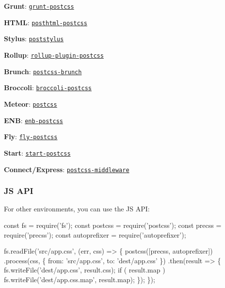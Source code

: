 \begin{DoxyItemize}
\item {\bfseries Grunt}\+: \href{https://github.com/nDmitry/grunt-postcss}{\tt {\ttfamily grunt-\/postcss}}
\item {\bfseries H\+T\+ML}\+: \href{https://github.com/posthtml/posthtml-postcss}{\tt {\ttfamily posthtml-\/postcss}}
\item {\bfseries Stylus}\+: \href{https://github.com/seaneking/poststylus}{\tt {\ttfamily poststylus}}
\item {\bfseries Rollup}\+: \href{https://github.com/egoist/rollup-plugin-postcss}{\tt {\ttfamily rollup-\/plugin-\/postcss}}
\item {\bfseries Brunch}\+: \href{https://github.com/brunch/postcss-brunch}{\tt {\ttfamily postcss-\/brunch}}
\item {\bfseries Broccoli}\+: \href{https://github.com/jeffjewiss/broccoli-postcss}{\tt {\ttfamily broccoli-\/postcss}}
\item {\bfseries Meteor}\+: \href{https://atmospherejs.com/juliancwirko/postcss}{\tt {\ttfamily postcss}}
\item {\bfseries E\+NB}\+: \href{https://github.com/awinogradov/enb-postcss}{\tt {\ttfamily enb-\/postcss}}
\item {\bfseries Fly}\+: \href{https://github.com/postcss/fly-postcss}{\tt {\ttfamily fly-\/postcss}}
\item {\bfseries Start}\+: \href{https://github.com/start-runner/postcss}{\tt {\ttfamily start-\/postcss}}
\item {\bfseries Connect/\+Express}\+: \href{https://github.com/jedmao/postcss-middleware}{\tt {\ttfamily postcss-\/middleware}}
\end{DoxyItemize}

\subsubsection*{JS A\+PI}

For other environments, you can use the JS A\+PI\+:


\begin{DoxyCode}
const fs = require('fs');
const postcss = require('postcss');
const precss = require('precss');
const autoprefixer = require('autoprefixer');

fs.readFile('src/app.css', (err, css) => \{
    postcss([precss, autoprefixer])
        .process(css, \{ from: 'src/app.css', to: 'dest/app.css' \})
        .then(result => \{
            fs.writeFile('dest/app.css', result.css);
            if ( result.map ) fs.writeFile('dest/app.css.map', result.map);
        \});
\});
\end{DoxyCode}


